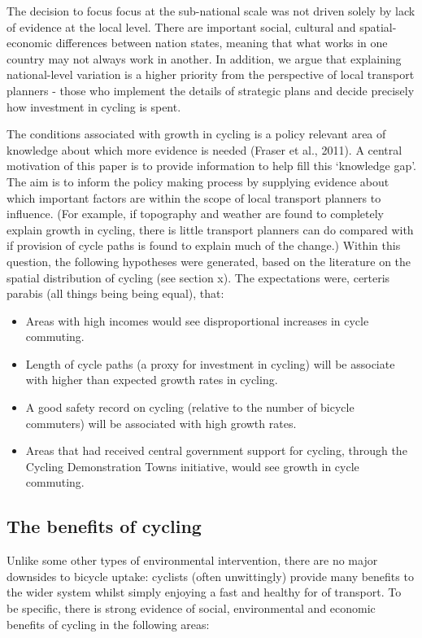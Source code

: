 The decision to focus focus at the sub-national scale was not driven
solely by lack of evidence at the local level. There are important
social, cultural and spatial-economic differences between nation states,
meaning that what works in one country may not always work in another.
In addition, we argue that explaining national-level variation is a
higher priority from the perspective of local transport planners - those
who implement the details of strategic plans and decide precisely how
investment in cycling is spent.

The conditions associated with growth in cycling is a policy relevant
area of knowledge about which more evidence is needed (Fraser et al.,
2011). A central motivation of this paper is to provide information to
help fill this `knowledge gap'. The aim is to inform the policy making
process by supplying evidence about which important factors are within
the scope of local transport planners to influence. (For example, if
topography and weather are found to completely explain growth in
cycling, there is little transport planners can do compared with if
provision of cycle paths is found to explain much of the change.) Within
this question, the following hypotheses were generated, based on the
literature on the spatial distribution of cycling (see section x). The
expectations were, certeris parabis (all things being being equal),
that:

\begin{itemize}
\itemsep1pt\parskip0pt
\item
  Areas with high incomes would see disproportional increases in cycle
  commuting.
\item
  Length of cycle paths (a proxy for investment in cycling) will be
  associate with higher than expected growth rates in cycling.
\item
  A good safety record on cycling (relative to the number of bicycle
  commuters) will be associated with high growth rates.
\item
  Areas that had received central government support for cycling,
  through the Cycling Demonstration Towns initiative, would see growth
  in cycle commuting.
\end{itemize}

\subsection{The benefits of cycling}\label{the-benefits-of-cycling}

Unlike some other types of environmental intervention, there are no
major downsides to bicycle uptake: cyclists (often unwittingly) provide
many benefits to the wider system whilst simply enjoying a fast and
healthy for of transport. To be specific, there is strong evidence of
social, environmental and economic benefits of cycling in the following
areas:

